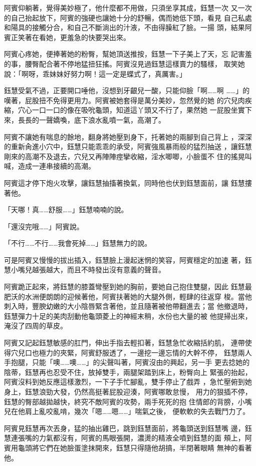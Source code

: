 阿賓仰躺著，覺得美妙極了，他什麼都不用做，只須坐享其成，鈺慧一次
又一次的自己抬起放下，阿賓的強硬也讓她十分的舒暢，偶而她低下頭，看見
自己私處和陽具的接觸分合，和自己不斷淌出的汁液，不由得臊紅了臉。一揚
頭，結果阿賓正笑著在看她，更羞急的快要哭出來。

阿賓心疼她，便捧著她的粉臀，幫她頂送推按，鈺慧一下子美上了天，忘
記害羞的事，腰臀配合著不停地猛扭狂搖。阿賓沒見過鈺慧這樣賣力的騷樣，
取笑她說：「啊呀，乖妹妹好努力啊！這一定是蝶式了，真厲害。」

鈺慧受氣不過，正要開口唾他，沒想到牙齦兒一酸，只能仰臉「啊……啊
……」的嘆著，屁股扭不免得更用力。阿賓被她套得是萬分美妙，忽然覺的她
的穴兒肉疾縮，穴心一口一口的像在吸吮龜頭，知道這丫頭又不行了，果然她
一屁股坐實下來，長長的一聲嬌喚，底下浪水亂噴一氣，高潮了。

阿賓不讓她有喘息的餘地，翻身將她壓到身下，托著她的兩腳到自己背上
，深深的重新肏進小穴中，鈺慧只能乖乖的承受，阿賓強風暴雨般的猛烈抽送
，讓鈺慧剛來的高潮不及退去，穴兒又再陣陣痙攣收縮，淫水唧唧，小臉蛋不
住的搖晃叫喊，造成一連串接續的高潮。

阿賓這才停下炮火攻擊，讓鈺慧抽搐著換氣，同時他也伏到鈺慧面前，讓
鈺慧摟著他。

「天哪！真……舒服……」鈺慧喃喃的說。

「還沒完哦……」阿賓說。

「不行……不行……我會死掉……」鈺慧無力的說。

可是阿賓又慢慢的拔出插入，鈺慧臉上漫起迷惘的笑容，阿賓穩定的加速
著，鈺慧小嘴兒越張越大，而且不時發出沒有意義的聲音。

阿賓跪正起來，將鈺慧的膝蓋彎壓到她的胸前，要她自己抱住雙腿，因此
鈺慧最肥沃的水洲便朗朗的迎候著他，阿賓扶著她的大腿外側，輕肆的往返穿
梭。當他刺入時，豐腴幼嫩的大小陰唇緊含著他，並且隨著被他帶翻進去；當
他撤退時，鈺慧彈力十足的美肉刮動他龜頭菱上的神經末稍，水份也大量的被
他提掃出來，淹沒了四周的草皮。

阿賓又記起鈺慧敏感的肛門，伸出手指去輕扣著，鈺慧急忙收縮括約肌，
連帶使得穴兒口也極力的夾緊，阿賓舒服透了，一邊挖一邊忘情的大幹不停，
鈺慧兩人手抱腿，只能「噢……噢……」的尖聲叫著，阿賓沒由的興起，另一手
更去捻她的陰蒂，鈺慧再也忍受不住，放掉雙手，兩腿架踏到床上，粉臀向上
緊張的抬起，阿賓沒料到她反應這樣激烈，一下子手忙腳亂，雙手停止了戲弄
，急忙壓俯到她身上，鈺慧浪勁大發，仍然高挺著屁股迎湊，阿賓哪敢怠慢，
用力的狠插不停，鈺慧的臀部越拋越快，終究不敵阿賓的攻勢，兩手死死的抱
住情郎的背膀，小嘴兒在他肩上亂咬亂啃，幾次「嗯……嗯……」喘氣之後，
便軟軟的失去戰鬥力了。

阿賓見鈺慧再次丟身，猛的抽出雞巴，跳到鈺慧面前，將龜頭送到鈺慧嘴
邊，鈺慧連張嘴的力氣都沒有，阿賓的馬眼張開，濃燙的精液全噴到鈺慧的面
頰上，阿賓用龜頭將它們在她臉蛋塗抹開來，鈺慧只得隨他胡搞，半閉著眼睛
無神的看著他。

